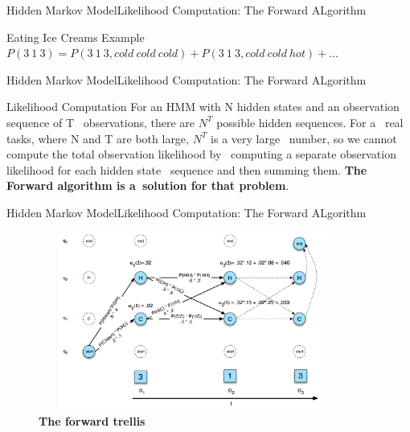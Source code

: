 \documentclass[10pt]{beamer}
\begin{document}
\begin{frame}{Hidden Markov Model}{Likelihood Computation: The Forward ALgorithm}
   \begin{block}{Eating Ice Creams Example}
         $P(3\ 1\ 3) = P(3\ 1\ 3, cold\ cold\ cold) + P(3\ 1\ 3, cold\ cold\ hot) + ...$
   \end{block}
\end{frame}

\begin{frame}{Hidden Markov Model}{Likelihood Computation: The Forward ALgorithm}
   \begin{block}{Likelihood Computation}
        For an HMM with N hidden states and an observation sequence of T \
        observations, there are $N^{T}$ possible hidden sequences. For a \
        real tasks, where N and T are both large, $N^{T}$ is a very large \
        number, so we cannot compute the total observation likelihood by \
        computing a separate observation likelihood for each hidden state \
        sequence and then summing them. \textbf{The Forward algorithm is a\
        solution for that problem}.
   \end{block}
\end{frame}

\begin{frame}{Hidden Markov Model}{Likelihood Computation: The Forward ALgorithm}
  \begin{figure}[h]
    \centering
    \includegraphics[width=4in,height=2.3in]{figures/the_forward_trellis.png}
    \caption {\textbf{The forward trellis}}
  \end{figure}
\end{frame}
\end{document}

